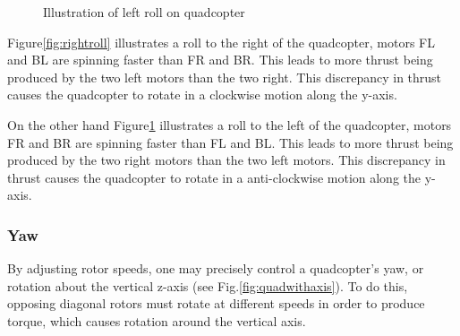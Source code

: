 \documentclass{article}
\begin{document}
\begin{figure}[H]
\begin{minipage}{.5\textwidth}
    \caption{Illustration of left roll on quadcopter}
    \label{fig:leftroll}
  \end{minipage}
\end{figure}

Figure\ref{fig:rightroll} illustrates a roll to the right of the quadcopter,
motors FL and BL are spinning faster than FR and BR. This leads to more thrust
being produced by the two left motors than the two right. This discrepancy in
thrust causes the quadcopter to rotate in a clockwise motion along the y-axis.

On the other hand Figure\ref{fig:leftroll} illustrates a roll to the left of the
quadcopter, motors FR and BR are spinning faster than FL and BL. This leads to
more thrust being produced by the two right motors than the two left motors.
This discrepancy in thrust causes the quadcopter to rotate in a anti-clockwise
motion along the y-axis.

\subsubsection{Yaw}
By adjusting rotor speeds, one may precisely control a quadcopter's yaw, or
rotation about the vertical z-axis (see Fig.\ref{fig:quadwithaxis}). To do this,
opposing diagonal rotors must rotate at different speeds in order to produce
torque, which causes rotation around the vertical axis.
\end{document}
